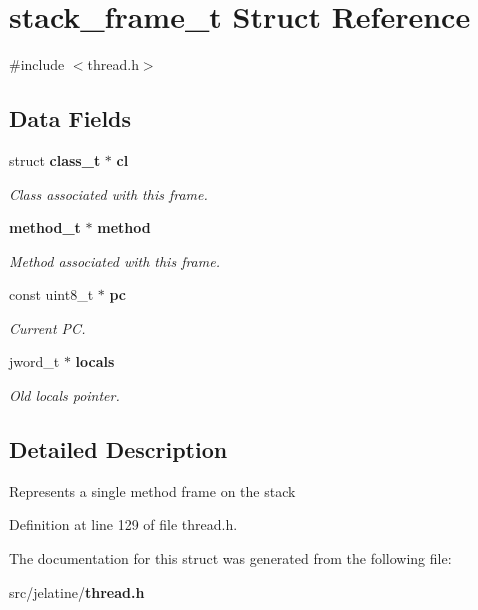 \section{stack\_\-frame\_\-t Struct Reference}
\label{structstack__frame__t}


{\ttfamily \#include $<$thread.h$>$}

\subsection*{Data Fields}
\begin{DoxyCompactItemize}
\item 
struct {\bf class\_\-t} $\ast$ {\bf cl}\label{structstack__frame__t_a88915b7aeec16d979d0a205fe8524251}

\begin{DoxyCompactList}\small\item\em Class associated with this frame. \item\end{DoxyCompactList}\item 
{\bf method\_\-t} $\ast$ {\bf method}\label{structstack__frame__t_ae70377cb515c48e77e90732d2ef3ed29}

\begin{DoxyCompactList}\small\item\em Method associated with this frame. \item\end{DoxyCompactList}\item 
const uint8\_\-t $\ast$ {\bf pc}\label{structstack__frame__t_a9d08a94a2fcd9d11490d3c1a1d643559}

\begin{DoxyCompactList}\small\item\em Current PC. \item\end{DoxyCompactList}\item 
jword\_\-t $\ast$ {\bf locals}\label{structstack__frame__t_a4cd9ce82dc5363b25c6780ca6018a800}

\begin{DoxyCompactList}\small\item\em Old locals pointer. \item\end{DoxyCompactList}\end{DoxyCompactItemize}


\subsection{Detailed Description}
Represents a single method frame on the stack 

Definition at line 129 of file thread.h.



The documentation for this struct was generated from the following file:\begin{DoxyCompactItemize}
\item 
src/jelatine/{\bf thread.h}\end{DoxyCompactItemize}
